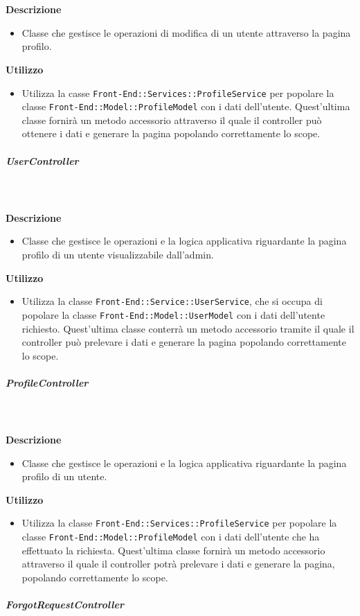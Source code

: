         \textbf{\\ \\ Descrizione} 
          \begin{itemize}
            \item[] Classe che gestisce le operazioni di modifica di un utente attraverso la pagina profilo.
          \end{itemize}      
        \textbf{Utilizzo}  
          \begin{itemize}
            \item[] Utilizza la casse \texttt{Front-End::Services::ProfileService} per popolare la classe \texttt{Front-End::Model::ProfileModel} con i dati dell'utente. Quest'ultima classe fornirà un metodo accessorio attraverso il quale il controller può ottenere i dati e generare la pagina popolando correttamente lo scope.
          \end{itemize}
      \subparagraph{UserController}
        
        \textbf{\\ \\ Descrizione} 
          \begin{itemize}
            \item[] Classe che gestisce le operazioni e la logica applicativa riguardante la pagina profilo di un utente visualizzabile dall'admin.
          \end{itemize}      
        \textbf{Utilizzo}  
          \begin{itemize}
            \item[] Utilizza la classe \texttt{Front-End::Service::UserService}, che si occupa di popolare la classe \texttt{Front-End::Model::UserModel} con i dati dell'utente richiesto. Quest'ultima classe conterrà un metodo accessorio tramite il quale il controller può prelevare i dati e generare la pagina popolando correttamente lo scope.
          \end{itemize}
      \subparagraph{ProfileController}
        
        \textbf{\\ \\ Descrizione} 
          \begin{itemize}
            \item[] Classe che gestisce le operazioni e la logica applicativa riguardante la pagina profilo di un utente.
          \end{itemize}      
        \textbf{Utilizzo}  
          \begin{itemize}
            \item[] Utilizza la classe \texttt{Front-End::Services::ProfileService} per popolare la classe \texttt{Front-End::Model::ProfileModel} con i dati dell'utente che ha effettuato la richiesta. Quest'ultima classe fornirà un metodo accessorio attraverso il quale il controller potrà prelevare i dati e generare la pagina, popolando correttamente lo scope.
          \end{itemize}
      \subparagraph{ForgotRequestController}
        
